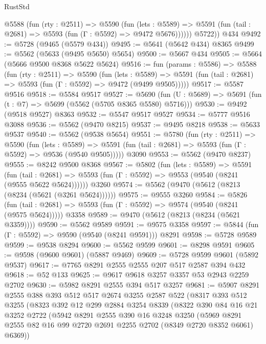 \begin{lexlean}{RustStd}
\begin{coremodule}
          @5588
            (fun (rty : @2511) =>
            @5590
              (fun (lets : @5589) =>
              @5591 (fun (tail : @2681) => @5593 (fun (Γ : @5592) => @9472 @5676))))))
        @5722))
    @434
@9492 := @5728 (@9465 (@5579 @434))
@9495 := @5641 (@5642 @434) @8365
@9499 := @5562 (@5633 (@9495 @5650) @5654)
@9500 := @5667 @434
@9505 := @5664 (@5666 @9500 @8368 @5622 @5624)
@9516 := fun (params : @5586) =>
  @5588
    (fun (rty : @2511) =>
    @5590
      (fun (lets : @5589) =>
      @5591 (fun (tail : @2681) => @5593 (fun (Γ : @5592) => @9472 (@9499 @9505)))))
@9517 := @5587 @9516
@9518 := @5584 @9517
@9527 := @5690 (fun (U : @5689) => @5691 (fun (t : @7) => @5699 (@5562 (@5705 @8365 @5580) @5716)))
@9530 := @9492 (@9518 @9527) @8363
@9532 := @5547 @9517 @9527
@9534 := @5777 @9516 @3088
@9536 := @5562 (@9470 @8215)
@9537 := @9495 @8218
@9538 := @5633 @9537
@9540 := @5562 (@9538 @5654)
@9551 := @5780
    (fun (rty : @2511) =>
    @5590
      (fun (lets : @5589) =>
      @5591 (fun (tail : @2681) => @5593 (fun (Γ : @5592) => @9536 (@9540 @9505)))))
    @3090
@9553 := @5562 (@9470 @8237)
@9555 := @8242 @9500 @8368
@9567 := @5802
    (fun (lets : @5589) =>
    @5591
      (fun (tail : @2681) => @5593 (fun (Γ : @5592) => @9553 (@9540 (@8241 (@9555 @5622 @5624))))))
    @3260
@9574 := @5562 (@9470 (@5612 (@8213 (@8234 (@5621 (@3261 @5624))))))
@9575 := @9555 @3260
@9584 := @5826
    (fun (tail : @2681) => @5593 (fun (Γ : @5592) => @9574 (@9540 (@8241 (@9575 @5624)))))
    @3358
@9589 := @9470 (@5612 (@8213 (@8234 (@5621 @3359))))
@9590 := @5562 @9589
@9591 := @9575 @3358
@9597 := @5844 (fun (Γ : @5592) => @9590 (@9540 (@8241 @9591))) @8291
@9598 := @5728 @9589
@9599 := @9538 @8294
@9600 := @5562 @9599
@9601 := @8298 @9591
@9605 := @9598 (@9600 @9601) (@5887 @9469)
@9609 := @5728 @9599 @9601 (@5892 @9537)
@9617 := @7765 @8291 @2555 @2555 @207 @517 @2587 @394 @432
@9618 := @52 @133
@9625 := @9617 @9618 @3257 @3357 @53 @2943 @2259 @2702
@9630 := @5982 @8291 @2555 @394 @517 @3257
@9681 := @5907
    @8291
    @2555
    @388
    @393
    @512
    @517
    @2674
    @3255
    @2587
    @522
    (@8317
      @393
      @512
      @3255
      (@8323
        @392
        @12
        @299
        @2884
        @3254
        @8339
        (@8322
          @390
          @84
          @16
          @21
          @3252
          @2722
          (@5942
            @8291
            @2555
            @390
            @16
            @3248
            @3250
            (@5969 @8291 @2555 @82 @16 @99 @2720 @2691 @2255 @2702 (@8349 @2720 @8352 @6061) @6369))

\end{coremodule}
\end{lexlean}
